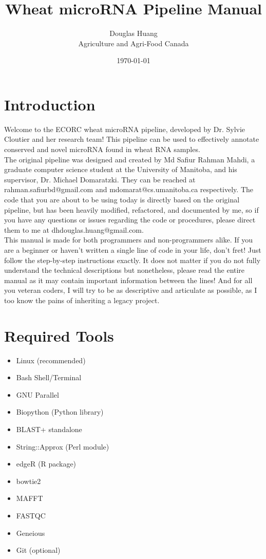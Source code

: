 \documentclass[12pt,titlepage]{article}
\title{Wheat microRNA Pipeline Manual}
\author{Douglas Huang\\Agriculture and Agri-Food Canada}
\date{\today}
\begin{document}
\maketitle
\section*{Introduction}
Welcome to the ECORC wheat microRNA pipeline, developed by Dr. Sylvie Cloutier and her research team! This pipeline can be used to effectively annotate conserved and novel microRNA found in wheat RNA samples.\\

The original pipeline was designed and created by Md Safiur Rahman Mahdi, a graduate computer science student at the University of Manitoba, and his supervisor, Dr. Michael Domaratzki. They can be reached at rahman.safiurbd@gmail.com and mdomarat@cs.umanitoba.ca respectively. The code that you are about to be using today is directly based on the original pipeline, but has been heavily modified, refactored, and documented by me, so if you have any questions or issues regarding the code or procedures, please direct them to me at dhdouglas.huang@gmail.com.\\

This manual is made for both programmers and non-programmers alike. If you are a beginner or haven't written a single line of code in your life, don't fret! Just follow the step-by-step instructions exactly. It does not matter if you do not fully understand the technical descriptions but nonetheless, please read the entire manual as it may contain important information between the lines! And for all you veteran coders, I will try to be as descriptive and articulate as possible, as I too know the pains of inheriting a legacy project.									
\section*{Required Tools}
\begin{multicols}{2}
\begin{itemize}
\item Linux (recommended)
\item Bash Shell/Terminal
\item GNU Parallel
\item Biopython (Python library)
\item BLAST+ standalone
\item String::Approx (Perl module)
\item edgeR (R package)
\item bowtie2
\item MAFFT
\item FASTQC
\item Geneious
\item Git (optional)
\end{itemize}
\end{multicols}
\end{document}
